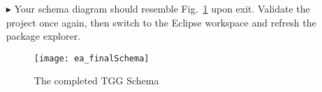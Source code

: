 \begin{itemize}
\vspace{0.5cm}

\begin{figure}[htbp]
   \centering
      \\
\end{figure}

\item[$\blacktriangleright$] Your schema diagram should resemble Fig.~\ref{ea:Schema_Complete} upon exit. Validate the project once again, then switch to the
Eclipse workspace and refresh the package explorer.

\newpage

\vspace*{3cm}

\begin{figure}[htbp]
  \hspace{-1.5cm}
  \texttt{[image: ea\_finalSchema]}
  \caption{The completed TGG Schema}
  \label{ea:Schema_Complete}
\end{figure}


\end{itemize}
